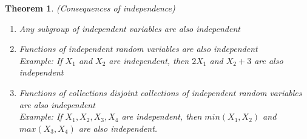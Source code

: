 \documentclass[12pt]{article}
\renewcommand{\_}[1]{\underline{ #1 }}
\newtheorem{theorem}{Theorem}[section]
\theoremstyle{definition}
\numberwithin{equation}{subsection}
\begin{document}
\begin{theorem} (Consequences of independence)
	\begin{enumerate}
		\item Any subgroup of independent variables are also independent
		\item Functions of independent random variables are also independent\\ Example: If $X_1$ and $X_2$ are independent, then $2X_1$ and $X_2+3$ are also independent
		\item Functions of collections disjoint collections of independent random variables are also independent\\
		Example: If $X_1, X_2, X_3, X_4$ are independent, then $min(X_1,X_2)$ and $max(X_3,X_4)$ are also independent.
	\end{enumerate}
\end{theorem}
\end{document}
